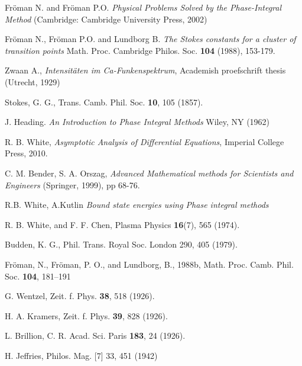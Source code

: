 \documentclass[aip,jmp,reprint]{revtex4-1}
\begin{document}
\begin{thebibliography}{30}

 Fr\"oman N. and Fr\"oman P.O. \textit{Physical Problems Solved by the Phase-Integral Method} (Cambridge: Cambridge University Press, 2002)

 Fr\"oman N., Fr\"oman P.O. and Lundborg B. \textit{The Stokes constants for a cluster of transition
points} Math. Proc. Cambridge Philos. Soc. \textbf{104} (1988), 153-179.

 Zwaan A., \textit{Intensit\"aten im Ca-Funkenspektrum}, Academish proefschrift thesis (Utrecht, 1929)

 Stokes, G. G., Trans. Camb. Phil. Soc. \textbf{10}, 105 (1857).

 J. Heading. {\it An Introduction to Phase Integral Methods} 
Wiley, NY (1962)

 R. B. White, {\it Asymptotic Analysis of Differential Equations}, Imperial College Press, 2010.

 C. M. Bender, S. A. Orszag, \textit{Advanced Mathematical methods for
Scientists and Engineers} (Springer, 1999), pp 68-76.

 R.B. White, A.Kutlin {\it Bound state energies using Phase integral methods} 

 R. B. White, and F. F. Chen, {Plasma Physics} \textbf{16}(7), 565 (1974).

 Budden, K. G., Phil. Trans. Royal Soc. London 290, 405 (1979).

 Fr\"oman, N., Fr\"oman, P. O., and Lundborg, B., 1988b, 
Math. Proc. Camb. Phil. Soc. \textbf{104}, 181–191

 G. Wentzel, Zeit. f. Phys. \textbf{38}, 518 (1926).

 H. A. Kramers, Zeit. f. Phys. \textbf{39}, 828 (1926).

 L. Brillion, C. R. Acad. Sci. Paris \textbf{183}, 24 (1926).

 H. Jeffries, Philos. Mag. [7] 33, 451 (1942)


\end{thebibliography}
\end{document}
